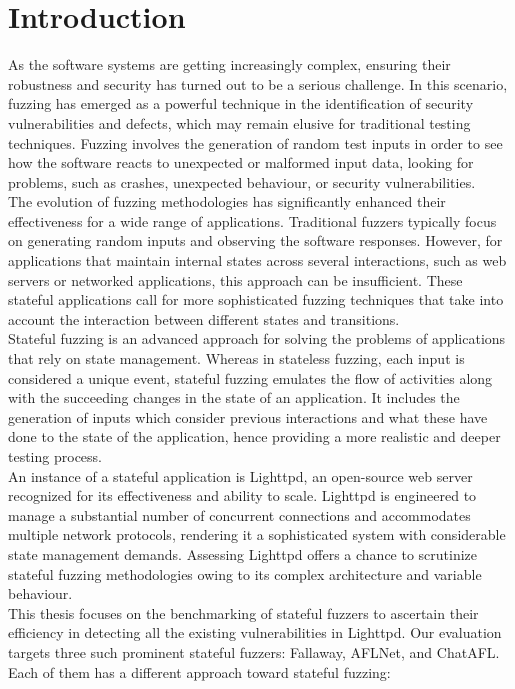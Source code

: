 \chapter{Introduction}

As the software systems are getting increasingly complex, ensuring their robustness and security has turned out to be a serious challenge. In this scenario, fuzzing has emerged as a powerful technique in the identification of security vulnerabilities and defects, which may remain elusive for traditional testing techniques. Fuzzing involves the generation of random test inputs in order to see how the software reacts to unexpected or malformed input data, looking for problems, such as crashes, unexpected behaviour, or security vulnerabilities.
\\The evolution of fuzzing methodologies has significantly enhanced their effectiveness for a wide range of applications. Traditional fuzzers typically focus on generating random inputs and observing the software responses. However, for applications that maintain internal states across several interactions, such as web servers or networked applications, this approach can be insufficient. These stateful applications call for more sophisticated fuzzing techniques that take into account the interaction between different states and transitions.
\\Stateful fuzzing is an advanced approach for solving the problems of applications that rely on state management. Whereas in stateless fuzzing, each input is considered a unique event, stateful fuzzing emulates the flow of activities along with the succeeding changes in the state of an application. It includes the generation of inputs which consider previous interactions and what these have done to the state of the application, hence providing a more realistic and deeper testing process.
\\An instance of a stateful application is Lighttpd, an open-source web server recognized for its effectiveness and ability to scale. Lighttpd is engineered to manage a substantial number of concurrent connections and accommodates multiple network protocols, rendering it a sophisticated system with considerable state management demands. Assessing Lighttpd offers a chance to scrutinize stateful fuzzing methodologies owing to its complex architecture and variable behaviour.
\\This thesis focuses on the benchmarking of stateful fuzzers to ascertain their efficiency in detecting all the existing vulnerabilities in Lighttpd. Our evaluation targets three such prominent stateful fuzzers: Fallaway, AFLNet, and ChatAFL. Each of them has a different approach toward stateful fuzzing:
